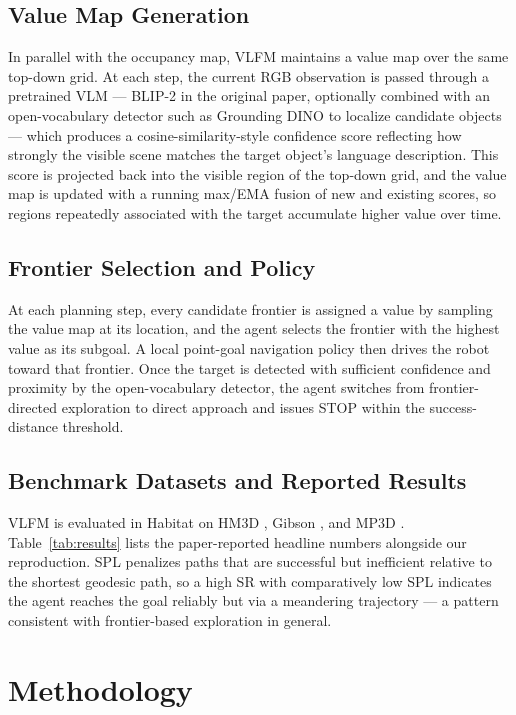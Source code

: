 \documentclass[conference]{IEEEtran}
\begin{document}
\subsection{Value Map Generation}
In parallel with the occupancy map, VLFM maintains a value map over the same top-down grid. At each step, the current RGB observation is passed through a pretrained VLM --- BLIP-2 in the original paper, optionally combined with an open-vocabulary detector such as Grounding DINO to localize candidate objects --- which produces a cosine-similarity-style confidence score reflecting how strongly the visible scene matches the target object's language description. This score is projected back into the visible region of the top-down grid, and the value map is updated with a running max/EMA fusion of new and existing scores, so regions repeatedly associated with the target accumulate higher value over time.

\subsection{Frontier Selection and Policy}
At each planning step, every candidate frontier is assigned a value by sampling the value map at its location, and the agent selects the frontier with the highest value as its subgoal. A local point-goal navigation policy then drives the robot toward that frontier. Once the target is detected with sufficient confidence and proximity by the open-vocabulary detector, the agent switches from frontier-directed exploration to direct approach and issues STOP within the success-distance threshold.

\subsection{Benchmark Datasets and Reported Results}
VLFM is evaluated in Habitat on HM3D \cite{hm3d}, Gibson \cite{gibson}, and MP3D \cite{mp3d}. Table~\ref{tab:results} lists the paper-reported headline numbers alongside our reproduction. SPL penalizes paths that are successful but inefficient relative to the shortest geodesic path, so a high SR with comparatively low SPL indicates the agent reaches the goal reliably but via a meandering trajectory --- a pattern consistent with frontier-based exploration in general.

\section{Methodology}
\label{sec:methodology}
\end{document}
